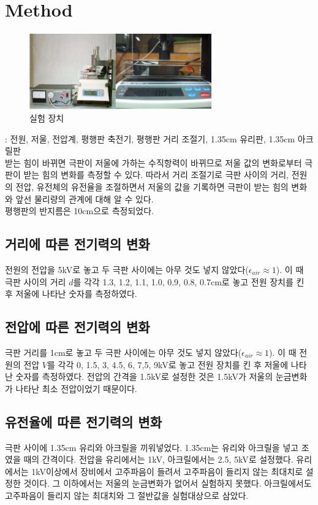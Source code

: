 \documentclass[a4paper]{article}
\begin{document}
\section{Method}
	\begin{figure}[h]
		\centering
		\includegraphics[width=0.7\textwidth]{img/expconfig.png}
		\caption{실험 장치}
	\end{figure}
	: 전원, 저울, 전압계, 평행판 축전기, 평행판 거리 조절기, 1.35cm 유리판, 1.35cm 아크릴판\\
	 받는 힘이 바뀌면 극판이 저울에 가하는 수직항력이 바뀌므로 저울 값의 변화로부터 극판이 받는 힘의 변화를 측정할 수 있다. 따라서 거리 조절기로 극판 사이의 거리, 전원의 전압, 유전체의 유전율을 조절하면서 저울의 값을 기록하면 극판이 받는 힘의 변화와 앞선 물리량의 관계에 대해 알 수 있다.\\
	평행판의 반지름은 10\si{cm}으로 측정되었다.

\subsection{거리에 따른 전기력의 변화}
	전원의 전압을 5\si{kV}로 놓고 두 극판 사이에는 아무 것도 넣지 않았다($\epsilon{}_{air} \approx 1$).
	이 때 극판 사이의 거리 $d$를 각각 1.3, 1.2, 1.1, 1.0, 0.9, 0.8, 0.7\si{cm}로 놓고 전원 장치를 킨 후 저울에 나타난 숫자를 측정하였다.

\subsection{전압에 따른 전기력의 변화}
	극판 거리를 1\si{cm}로 놓고 두 극판 사이에는 아무 것도 넣지 않았다($\epsilon{}_{air} \approx 1$).
	이 때 전원의 전압 $V$를 각각 0, 1.5, 3, 4.5, 6, 7,5, 9\si{kV}로 놓고 전원 장치를 킨 후 저울에 나타난 숫자를 측정하였다. 
	전압의 간격을 1.5\si{kV}로 설정한 것은 1.5\si{kV}가 저울의 눈금변화가 나타난 최소 전압이었기 때문이다.

\subsection{유전율에 따른 전기력의 변화}
	극판 사이에 1.35\si{cm} 유리와 아크릴을 끼워넣었다. 1.35\si{cm}는 유리와 아크릴을 넣고 조였을 때의 간격이다.
	전압을 유리에서는 1\si{kV}, 아크릴에서는 2.5, 5\si{kV}로 설정했다. 
	유리에서는 1\si{kV}이상에서 장비에서 고주파음이 들려서 고주파음이 들리지 않는 최대치로 설정한 것이다. 
	그 이하에서는 저울의 눈금변화가 없어서 실험하지 못했다. 
	아크릴에서도 고주파음이 들리지 않는 최대치와 그 절반값을 실험대상으로 삼았다.  
\end{document}
